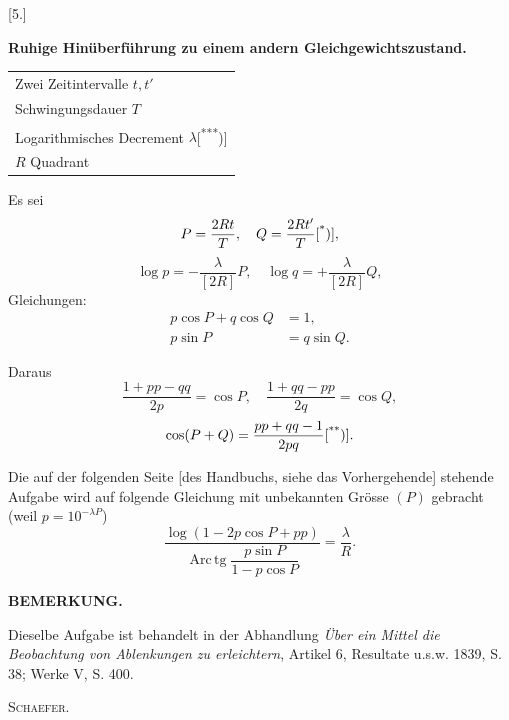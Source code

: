 \clearpage\begingroup{}
\begin{center}[5.]\end{center}
\noindent{\small [S. 187]}
\begin{center}\textbf{Ruhige Hinüberführung zu einem andern Gleichgewichtszustand.}\end{center}
\noindent\hspace*{\parindent}\begin{tabular}{@{}l@{}}
Zwei Zeitintervalle \(t,t'\)\\
Schwingungsdauer \(T\)\\
Logarithmisches Decrement \(\lambda\)[\textsuperscript{***})]\\
\(R\) Quadrant
\end{tabular}
\begingroup\renewcommand{\thefootnote}{}\endgroup
\clearpage{}
\indent Es sei
\[
P=\frac{2Rt}{T},\quad Q=\frac{2Rt'}{T}\text{[\textsuperscript{*})]},
\]
\begingroup\renewcommand{\thefootnote}{}\footnotetext{\(\Bigl[\)\textsuperscript{*}) In der Handschrift steht \(Q=\dfrac{2Rt}{T}.\Bigr]\)}\endgroup
\[
\log p=-\frac{\lambda}{[2R]}P,\quad\log q=+\frac{\lambda}{[2R]}Q,
\]
\noindent Gleichungen:
\[
\begin{aligned}
p\cos P+q\cos Q&=1,\\
p\sin P&=q\sin Q.
\end{aligned}
\]
\begin{center}
\end{center}
\noindent Daraus
\[
\frac{1+pp-qq}{2p}=\cos P,\quad
\frac{1+qq-pp}{2q}=\cos Q,
\]
\[
\cos(P+Q)=\frac{pp+qq-1}{2pq}\text{[\textsuperscript{**})]}.
\]
\begingroup\renewcommand{\thefootnote}{}\endgroup
\noindent{\small [S. 186]}\par
\noindent Die auf der folgenden Seite [des Handbuchs, siehe das Vorhergehende] stehende
Aufgabe wird auf folgende Gleichung mit  unbekannten Grösse \((P)\) gebracht
(weil \(p=10^{-\lambda P}\))
\[
\frac{\log(1-2p\cos P+pp)}{\operatorname{Arc\,tg}\dfrac{p\sin P}{1-p\cos P}}=\frac{\lambda}{R}.
\]
\bigskip\begin{center}\textbf{BEMERKUNG.}\end{center}
{\small\noindent\hspace*{\parindent}Dieselbe Aufgabe ist behandelt in der Abhandlung \textit{Über ein Mittel die Beobachtung von Ablenkungen
zu erleichtern}, Artikel 6, Resultate u.s.w. 1839, S. 38; Werke V, S. 400.
\par\raggedleft\textsc{Schaefer}.\par}
\clearpage\endgroup

